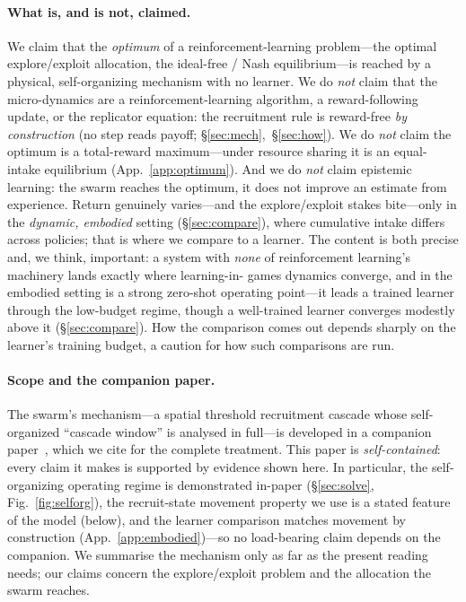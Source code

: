 \documentclass{article}
\begin{document}
\paragraph{What is, and is not, claimed.} We claim that the \emph{optimum} of a reinforcement-learning
problem---the optimal explore/exploit allocation, the ideal-free / Nash equilibrium---is reached by a physical,
self-organizing mechanism with no learner. We do \emph{not} claim that the micro-dynamics are a
reinforcement-learning algorithm, a reward-following update, or the replicator equation: the recruitment rule
is reward-free \emph{by construction} (no step reads payoff; \S\ref{sec:mech},~\S\ref{sec:how}). We do
\emph{not} claim the optimum is a total-reward maximum---under resource sharing it is an equal-intake
equilibrium (App.~\ref{app:optimum}). And we do \emph{not} claim epistemic learning: the swarm reaches the
optimum, it does not improve an estimate from experience. Return genuinely varies---and the explore/exploit
stakes bite---only in the \emph{dynamic, embodied} setting (\S\ref{sec:compare}), where cumulative intake
differs across policies; that is where we compare to a learner. The content is both precise and, we think,
important: a system with \emph{none} of reinforcement learning's machinery lands exactly where learning-in-
games dynamics converge, and in the embodied setting is a strong zero-shot operating point---it leads a trained
learner through the low-budget regime, though a well-trained learner converges modestly above it
(\S\ref{sec:compare}). How the comparison comes out depends sharply on the learner's training budget, a caution
for how such comparisons are run.

\paragraph{Scope and the companion paper.} The swarm's mechanism---a spatial threshold recruitment cascade
whose self-organized ``cascade window'' is analysed in full---is developed in a companion
paper~\citep{partI}, which we cite for the complete treatment. This paper is \emph{self-contained}: every
claim it makes is supported by evidence shown here. In particular, the self-organizing operating regime is
demonstrated in-paper (\S\ref{sec:solve}, Fig.~\ref{fig:selforg}), the recruit-state movement property we use
is a stated feature of the model (below), and the learner comparison matches movement by construction
(App.~\ref{app:embodied})---so no load-bearing claim depends on the companion. We summarise the mechanism only
as far as the present reading needs; our claims concern the explore/exploit problem and the allocation the
swarm reaches.
\end{document}

